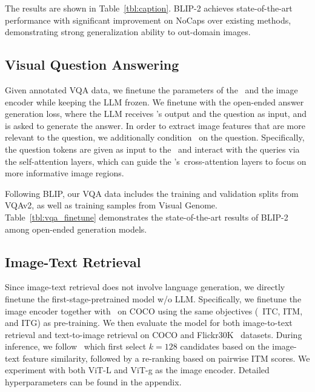 The results are shown in Table~\ref{tbl:caption}.
BLIP-2 achieves state-of-the-art performance with significant improvement on NoCaps over existing methods,
demonstrating strong generalization ability to out-domain images.

\subsection{Visual Question Answering}

Given annotated VQA data,
we finetune the parameters of the \name~and the image encoder while keeping the LLM frozen. 
We finetune with the open-ended answer generation loss,
where the LLM receives \name's output and the question as input,
and is asked to generate the answer.
In order to extract image features that are more relevant to the question,
we additionally condition \name~on the question.
Specifically,
the question tokens are given as input to the \name~and interact with the queries via the self-attention layers,
which can guide the \name's~cross-attention layers to focus on more informative image regions.


Following BLIP,
our VQA data includes the training and validation splits from VQAv2, as well as training samples from Visual Genome.
Table~\ref{tbl:vqa_finetune} demonstrates the state-of-the-art results of BLIP-2 among open-ended generation models.




\subsection{Image-Text Retrieval}

Since image-text retrieval does not involve language generation,
we directly finetune the first-stage-pretrained model w/o LLM.
Specifically,
we finetune the image encoder together with \name~on COCO using the same objectives (\ie~ITC, ITM, and ITG) as pre-training.
We then evaluate the model for both image-to-text retrieval and text-to-image retrieval on COCO and Flickr30K~\cite{flickr} datasets.
During inference,
we follow~\citet{ALBEF,blip} which first select $k=128$ candidates based on the image-text feature similarity, followed by a re-ranking based on pairwise ITM scores.
We experiment with both ViT-L and ViT-g as the image encoder.
Detailed hyperparameters can be found in the appendix.

